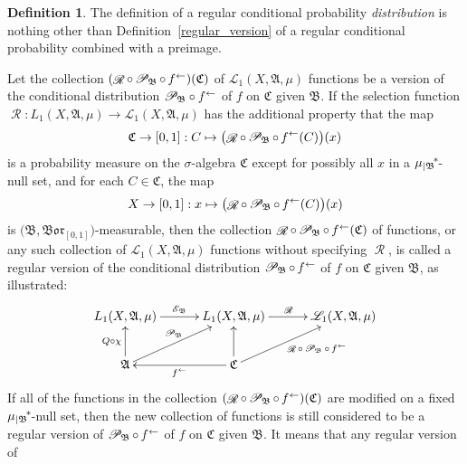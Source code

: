 \documentclass[
twoside=true,
paper=letter,
fontsize=9pt,
pagesize=auto,
leqno,
openany,
headsepline,
overfullrule,
]{scrbook}
\theoremstyle{plain}
\theoremstyle{plain}
\theoremstyle{definition}
\theoremstyle{bfnoteitalic}
\theoremstyle{bfnoteroman}
\newtheorem{defnboldnote}[thm]{Definition}
\newcommand{\sigalg}[1]{\mathfrak{#1}}
\newcommand{\cali}[1]{\mathscr{#1}}
\newcommand{\condexpop}[1]{\mathop{\cali{E}\hspace{-1pt}}\nolimits_{#1}}
\newcommand{\condprobop}[1]{\mathop{\cali{P}\hspace{-1pt}}\nolimits_{#1}}
\newcommand{\borel}{\mathfrak{Bor}}
\newcommand{\textsigma}{\hbox{\large{$\sigma$}}\kern-1pt}
\newcommand{\restrictedto}[1]{_{\lvert#1}\kern-1.5pt}
\newcommand{\preimage}[1]{\mathop{#1^{\leftarrow}}}
\newcommand{\sigmaalgebra}{\sigalg{A}}
\newcommand{\sigmaalgebraii}{\sigalg{B}}
\newcommand{\sigmaalgebraiii}{\sigalg{C}}
\newcommand{\kernast}{\ast\kern-1pt}
\newcommand{\Lone}{L_1(\measurespace, \sigmaalgebra, \measure)}
\newcommand{\caliLone}{\cali{L}_1(\measurespace, \sigmaalgebra, \measure)}
\newcommand{\function}{f}
\newcommand{\measurespace}{X}
\newcommand{\mspaceelt}{x}
\newcommand{\measure}{\mu}
\newcommand{\setiii}{C}
\newcommand{\regular}{\mathop{\cali{R}}}
\begin{document}
\begin{defnboldnote}\label{regular_conditional_distribution}
The definition of a
regular conditional probability \emph{distribution}
is nothing other than Definition~\ref{regular_version} of a regular conditional probability combined with a preimage.

Let the collection
$(\regular\circ\condprobop{\sigmaalgebraii}\circ\preimage{\function})
(\sigmaalgebraiii)$ of $\caliLone$ functions be a version of the conditional distribution
${\condprobop{\sigmaalgebraii}}\circ \preimage{\function}$ of $\function$ on $\sigmaalgebraiii$ given  
$\sigmaalgebraii$.
If the selection function 
$\regular:\Lone\to\caliLone$
has the additional property that the map
\[
\sigmaalgebraiii\to [0,1]: \setiii \mapsto 
\bigl( \regular\circ\condprobop{\sigmaalgebraii} \circ\preimage{\function}
(\setiii)\bigr)(\mspaceelt)
\]
is a probability measure on the \textsigma\hyp{}algebra $\sigmaalgebraiii$ except for possibly all
$\mspaceelt$ in a 
${\measure\restrictedto{\sigmaalgebraii}}^\kernast$-null set,
and for each
$\setiii\in\sigmaalgebraiii$, the map 
\[
\measurespace\to [0,1] : \mspaceelt\mapsto
\bigl( \regular\circ\condprobop{\sigmaalgebraii}\circ\preimage{\function}
(\setiii)\bigr)(\mspaceelt)
\]
is $\bigl(\sigmaalgebraii, \borel_{[0,1]}\bigr)$\hyp{}measurable,
then the collection 
$\regular\circ\condprobop{\sigmaalgebraii}\circ\preimage{\function}
(\sigmaalgebraiii)$ 
of functions, or any such collection of
$\caliLone$ functions without specifying $\regular$,
is called a regular version of the conditional distribution 
$\condprobop{\sigmaalgebraii}\circ\preimage{\function}$ of $\function$ on 
$\sigmaalgebraiii$ given $\sigmaalgebraii$,
as illustrated:
\[
\xymatrix@C=30pt{ 
\Lone \ar[r]^{\condexpop{\sigmaalgebraii}} 
& \Lone \ar[r]^{\regular} & \caliLone
\\
\sigmaalgebra \ar[u]^-{Q\circ\chi} \ar[ur]^{\condprobop{\sigmaalgebraii}} 
& \sigmaalgebraiii 
\ar[l]^{\preimage{\function}} 
\ar[u]
\ar[ur]_{\regular
\makebox[0pt][l]{$\scriptstyle{\circ\condprobop{\sigmaalgebraii}\circ\preimage{\function}}$}
}
\\
}
\]
If all of the functions in the collection
$(\regular\circ\condprobop{\sigmaalgebraii}\circ\preimage{\function})
(\sigmaalgebraiii)$
are modified on a fixed
${\measure\restrictedto\sigmaalgebraii}^\kernast$-null set, then the new collection of functions is still considered to be a 
regular version of 
$\condprobop{\sigmaalgebraii}\circ\preimage{\function}$ 
of $\function$
on $\sigmaalgebraiii$ given $\sigmaalgebraii$.
It means that any regular version of 

\end{defnboldnote}
\end{document}

